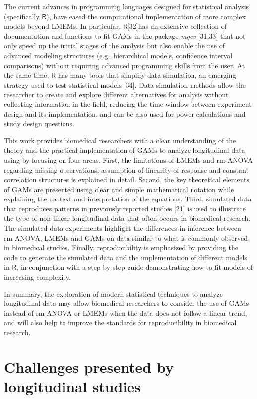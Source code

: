 \documentclass[
]{article}
\begin{document}
The current advances in programming languages designed for statistical analysis (specifically \(\textsf{R}\)), have eased the computational implementation of more complex models beyond LMEMs. In particular, \(\textsf{R}\){[}32{]}has an extensive collection of documentation and functions to fit GAMs in the package \emph{mgcv} {[}31,33{]} that not only speed up the initial stages of the analysis but also enable the use of advanced modeling structures (e.g.~hierarchical models, confidence interval comparisons) without requiring advanced programming skills from the user. At the same time, \(\textsf{R}\) has many tools that simplify data simulation, an emerging strategy used to test statistical models {[}34{]}. Data simulation methods allow the researcher to create and explore different alternatives for analysis without collecting information in the field, reducing the time window between experiment design and its implementation, and can be also used for power calculations and study design questions.

This work provides biomedical researchers with a clear understanding of the theory and the practical implementation of GAMs to analyze longitudinal data using by focusing on four areas. First, the limitations of LMEMs and rm-ANOVA regarding missing observations, assumption of linearity of response and constant correlation structures is explained in detail. Second, the key theoretical elements of GAMs are presented using clear and simple mathematical notation while explaining the context and interpretation of the equations. Third, simulated data that reproduces patterns in previously reported studies {[}21{]} is used to illustrate the type of non-linear longitudinal data that often occurs in biomedical research. The simulated data experiments highlight the differences in inference between rm-ANOVA, LMEMs and GAMs on data similar to what is commonly observed in biomedical studies. Finally, reproducibility is emphasized by providing the code to generate the simulated data and the implementation of different models in \(\textsf{R}\), in conjunction with a step-by-step guide demonstrating how to fit models of increasing complexity.

In summary, the exploration of modern statistical techniques to analyze longitudinal data may allow biomedical researchers to consider the use of GAMs instead of rm-ANOVA or LMEMs when the data does not follow a linear trend, and will also help to improve the standards for reproducibility in biomedical research.

\hypertarget{challenges-presented-by-longitudinal-studies}{%
\section{Challenges presented by longitudinal studies}\label{challenges-presented-by-longitudinal-studies}}
\end{document}
